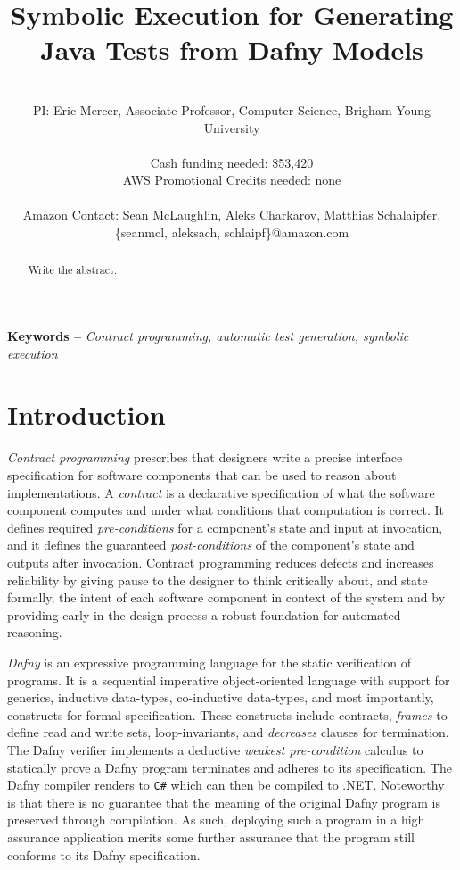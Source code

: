 \documentclass[11pt,onecolumn,notitlepage]{article}
\makeatletter
\renewcommand{\maketitle}{\bgroup\setlength{\parindent}{0pt}
\begin{flushleft}
  \Large{\textbf{\@title}}
  
  \normalsize{\@author}
\end{flushleft}\egroup
}
\makeatother
\begin{document}
\title{Symbolic Execution for Generating Java Tests from Dafny Models}
\author{\hfill \\
        PI: Eric Mercer, Associate Professor, Computer Science, Brigham Young University\\
        \hfill \\
        Cash funding needed: \$53,420 \\
        AWS Promotional Credits needed: none\\
        \hfill \\
        Amazon Contact: Sean McLaughlin, Aleks Charkarov, Matthias Schalaipfer, \{seanmcl, aleksach, schlaipf\}@amazon.com}

\maketitle

\begin{abstract}
  Write the abstract.
\end{abstract}

\providecommand{\keywords}[1]{\noindent\textbf{Keywords -- } \textit{#1}}
\keywords{Contract programming, automatic test generation, symbolic execution}

\section*{Introduction}
\emph{Contract programming} prescribes that designers write a precise interface specification for software components that can be used to reason about implementations. A \emph{contract} is a declarative specification of what the software component computes and under what conditions that computation is correct. It defines required \emph{pre-conditions} for a component's state and input at invocation, and it defines the guaranteed \emph{post-conditions} of the component's state and outputs after invocation. Contract programming reduces defects and increases reliability by giving pause to the designer to think critically about, and state formally, the intent of each software component in context of the system and by providing early in the design process a robust foundation for automated reasoning. 

\emph{Dafny} is an expressive programming language for the static verification of programs. It is a sequential imperative object-oriented language with support for generics, inductive data-types, co-inductive data-types, and most importantly, constructs for formal specification. These constructs include contracts, \emph{frames} to define read and write sets, loop-invariants, and \emph{decreases} clauses for termination. The Dafny verifier implements a deductive \emph{weakest pre-condition} calculus to statically prove a Dafny program terminates and adheres to its specification. The Dafny compiler renders to \texttt{C\#} which can then be compiled to .NET. Noteworthy is that there is no guarantee that the meaning of the original Dafny program is preserved through compilation. As such, deploying such a program in a high assurance application merits some further assurance that the program still conforms to its Dafny specification.  
\end{document}
